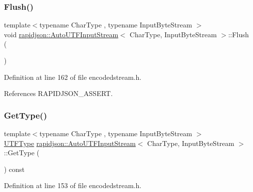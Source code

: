 \subsubsection{\texorpdfstring{Flush()}{Flush()}}
{\footnotesize\ttfamily template$<$typename Char\+Type , typename Input\+Byte\+Stream $>$ \\
void \mbox{\hyperlink{classrapidjson_1_1_auto_u_t_f_input_stream}{rapidjson\+::\+Auto\+U\+T\+F\+Input\+Stream}}$<$ Char\+Type, Input\+Byte\+Stream $>$\+::Flush (\begin{DoxyParamCaption}{ }\end{DoxyParamCaption})}



Definition at line 162 of file encodedstream.\+h.


\begin{DoxyCode}{0}

\end{DoxyCode}


References R\+A\+P\+I\+D\+J\+S\+O\+N\+\_\+\+A\+S\+S\+E\+RT.

\mbox{\label{classrapidjson_1_1_auto_u_t_f_input_stream_a3666311c98787d9ed61b9fed2f3ac983}} 
\subsubsection{\texorpdfstring{GetType()}{GetType()}}
{\footnotesize\ttfamily template$<$typename Char\+Type , typename Input\+Byte\+Stream $>$ \\
\mbox{\hyperlink{namespacerapidjson_a4aacabc0f8cea1cd628f466d890773eb}{U\+T\+F\+Type}} \mbox{\hyperlink{classrapidjson_1_1_auto_u_t_f_input_stream}{rapidjson\+::\+Auto\+U\+T\+F\+Input\+Stream}}$<$ Char\+Type, Input\+Byte\+Stream $>$\+::Get\+Type (\begin{DoxyParamCaption}{ }\end{DoxyParamCaption}) const}



Definition at line 153 of file encodedstream.\+h.



